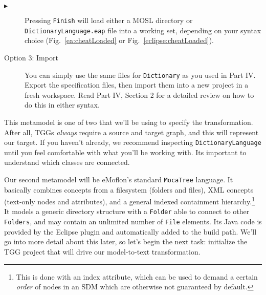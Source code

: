 \begin{description}
\item[$\blacktriangleright$] Pressing \texttt{Finish} will load either a MOSL directory or \texttt{Dict\-ion\-ary\-Lang\-uage.eap} file into a working set,
depending on your syntax choice (Fig.~\ref{ea:cheatLoaded} or Fig.~\ref{eclipse:cheatLoaded}).

\begin{figure}[htbp]
   \centering
      \caption{}
\end{figure}

\clearpage %

\item[Option 3: Import] You can simply use the same files for \texttt{Dictionary} as you used in Part IV. Export the specification files, then import them
into a new project in a fresh workspace. Read Part IV, Section 2 for a detailed review on how to do this in either syntax.

\end{description} 

\vspace{0.5cm}

This metamodel is one of two that we'll be using to specify the transformation. After all, TGGs \emph{always} require a source and target graph, and this will
represent our target. If you haven't already, we recommend inspecting \texttt{DictionaryLanguage} until you feel comfortable with what you'll be working with.
Its important to understand which classes are connected.

Our second metamodel will be eMoflon's standard \texttt{MocaTree} language. It basically combines concepts from a filesystem (folders and files), XML concepts
(text-only nodes and attributes), and a general indexed containment hierarchy.\footnote{This is done with an index attribute, which can be used to demand a
certain \emph{order} of nodes in an SDM which are otherwise not guaranteed by default.} It models a generic directory structure with a \texttt{Folder} able to
connect to other \texttt{Folders}, and may contain an unlimited number of \texttt{File} elements. Its Java code is provided by the Eclipse plugin and
automatically added to the build path.  We'll go into more detail about this later, so let's begin the next task: initialize the TGG project that will drive our
model-to-text transformation.







